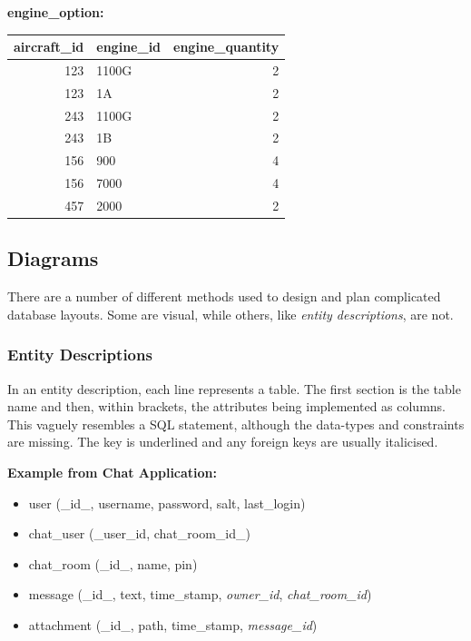 \documentclass[10pt]{article}
\begin{document}
\textbf{engine\_option:}

\begin{center}
\begin{tabular}{rlr}
\hline
aircraft\_id & engine\_id & engine\_quantity\\
\hline
123 & 1100G & 2\\
123 & 1A & 2\\
243 & 1100G & 2\\
243 & 1B & 2\\
156 & 900 & 4\\
156 & 7000 & 4\\
457 & 2000 & 2\\
\hline
\end{tabular}
\end{center}

\subsection{Diagrams}
\label{sec:org82bee46}

There are a number of different methods used to design and plan complicated database layouts. Some are visual, while others, like \emph{entity descriptions}, are not.

\subsubsection{Entity Descriptions}
\label{sec:org62e0dba}

In an entity description, each line represents a table. The first section is the table name and then, within brackets, the attributes being implemented as columns. This vaguely resembles a SQL statement, although the data-types and constraints are missing. The key is underlined and any foreign keys are usually italicised.

\textbf{Example from Chat Application:}

\begin{itemize}
\item user (\_id\_, username, password, salt, last\_login)
\item chat\_user (\_user\_id, chat\_room\_id\_)
\item chat\_room (\_id\_, name, pin)
\item message (\_id\_,  text, time\_stamp, \emph{owner\_id}, \emph{chat\_room\_id})
\item attachment (\_id\_, path, time\_stamp, \emph{message\_id})
\end{itemize}
\end{document}
